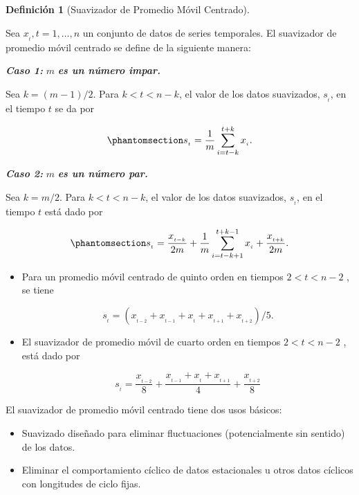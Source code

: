 \documentclass[
  us-letterpaper,
]{scrreprt}
\theoremstyle{plain}
\theoremstyle{definition}
\newtheorem{definition}{Definición}[chapter]
\theoremstyle{definition}
\theoremstyle{plain}
\theoremstyle{remark}
\begin{document}
\begin{definition}[Suavizador de Promedio Móvil
Centrado]\protect\hypertarget{def-CMAS}{}\label{def-CMAS}

Sea \(x_{_t}, t=1,\ldots,n\) un conjunto de datos de series temporales.
El suavizador de promedio móvil centrado se define de la siguiente
manera:

\textbf{\emph{Caso 1:}} \(m\) \textbf{\emph{es un número impar.}}

Sea \(k= (m−1)/2\). Para \(k <t< n - k\), el valor de los datos
suavizados, \(s_{_t}\), en el tiempo \(t\) se da por

\begin{equation}\phantomsection\label{eq-mimpar}{
s_{_t}=\frac{1}{m}\sum_{i=t-k}^{t+k}x_{_i}.
}\end{equation}

\textbf{\emph{Caso 2:}} \(m\) \textbf{\emph{es un número par.}}

Sea \(k= m/2\). Para \(k <t< n - k\), el valor de los datos suavizados,
\(s_{_t}\), en el tiempo \(t\) está dado por

\begin{equation}\phantomsection\label{eq-mpar}{
s_{_t}= \frac{x_{_{t-k}}}{2m}+\frac{1}{m}\sum_{i=t-k+1}^{t+k-1}x_{_i}+\frac{x_{_{t+k}}}{2m}.
}\end{equation}

\end{definition}

\begin{tcolorbox}[enhanced jigsaw, bottomtitle=1mm, coltitle=black, breakable, leftrule=.75mm, left=2mm, rightrule=.15mm, titlerule=0mm, toprule=.15mm, toptitle=1mm, colback=white, colframe=quarto-callout-caution-color-frame, title={Ejemplos}, colbacktitle=quarto-callout-caution-color!10!white, arc=.35mm, bottomrule=.15mm, opacitybacktitle=0.6, opacityback=0]

\begin{itemize}
\item
  Para un promedio móvil centrado de quinto orden en tiempos
  \(2 <t < n -2\) , se tiene

  \[
  s_{_t}=(x_{_{t-2}}+x_{_{t-1}}+x_{_t}+x_{_{t+1}}+x_{_{t+2}})/5.
  \]
\item
  El suavizador de promedio móvil de cuarto orden en tiempos
  \(2 <t < n -2\) , está dado por

  \[
  s_{_t}=\frac{x_{_{t-2}}}{8}+\frac{x_{_{t-1}}+x_{_t}+x_{_{t+1}}}{4}+\frac{x_{_{t+2}}}{8}
  \]
\end{itemize}

El suavizador de promedio móvil centrado tiene dos usos básicos:

\begin{itemize}
\item
  Suavizado diseñado para eliminar fluctuaciones (potencialmente sin
  sentido) de los datos.
\item
  Eliminar el comportamiento cíclico de datos estacionales u otros datos
  cíclicos con longitudes de ciclo fijas.
\end{itemize}

\end{tcolorbox}
\end{document}
